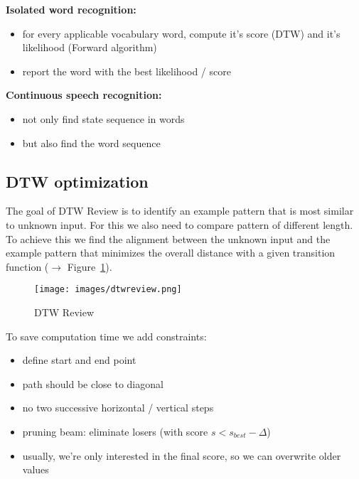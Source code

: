 \textbf{Isolated word recognition:}
\begin{itemize}
    \item for every applicable vocabulary word, compute it's score (DTW) and it's likelihood (Forward algorithm)
    \item report the word with the best likelihood / score
\end{itemize}

\vspace{5pt}

\textbf{Continuous speech recognition:}
\begin{itemize}
    \item not only find state sequence in words
    \item but also find the word sequence
\end{itemize}

\vspace{5pt}

\subsection{DTW optimization}

The goal of DTW Review is to identify an example pattern that is most similar to unknown input. For this we also need to compare pattern of different length.
To achieve this we find the alignment between the unknown input and the example pattern that minimizes the overall distance with a given transition function ($\to$ Figure~\ref{fig:DTWReview}). 

\begin{figure}[htb]
\centering
\texttt{[image: images/dtwreview.png]}
\caption{\label{fig:DTWReview} DTW Review}
\end{figure}

To save computation time we add constraints:

\begin{itemize}
    \item define start and end point
    \item path should be close to diagonal
    \item no two successive horizontal / vertical steps
    \item pruning beam: eliminate losers (with score $s < s_{best} - \Delta$)
    \item usually, we're only interested in the final score, so we can overwrite older values
\end{itemize}

